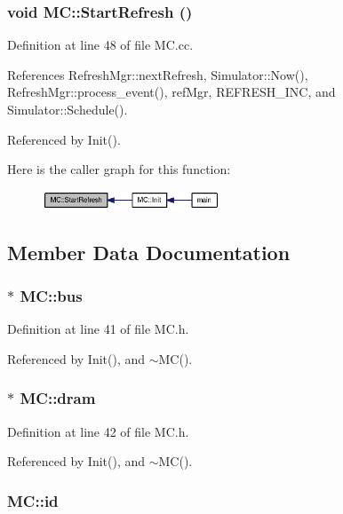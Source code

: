 \subsubsection[{StartRefresh}]{\setlength{\rightskip}{0pt plus 5cm}void MC::StartRefresh ()}\label{classMC_1f4c68b63112b1bd4fa8bcdf47a8e57c}




Definition at line 48 of file MC.cc.

References RefreshMgr::nextRefresh, Simulator::Now(), RefreshMgr::process\_\-event(), refMgr, REFRESH\_\-INC, and Simulator::Schedule().

Referenced by Init().

Here is the caller graph for this function:\nopagebreak
\begin{figure}[H]
\begin{center}
\leavevmode
\includegraphics[width=149pt]{classMC_1f4c68b63112b1bd4fa8bcdf47a8e57c_icgraph}
\end{center}
\end{figure}


\subsection{Member Data Documentation}
\subsubsection[{bus}]{$\ast$ {\bf MC::bus}}\label{classMC_5e52255c7c0f51558148857c35c5b233}




Definition at line 41 of file MC.h.

Referenced by Init(), and $\sim$MC().
\subsubsection[{dram}]{$\ast$ {\bf MC::dram}}\label{classMC_f809d7e712e3b14f455f9945a4f70cd8}




Definition at line 42 of file MC.h.

Referenced by Init(), and $\sim$MC().
\subsubsection[{id}]{ {\bf MC::id}}\label{classMC_44f183ff320c8100d4d7bbe9cd2f2086}




